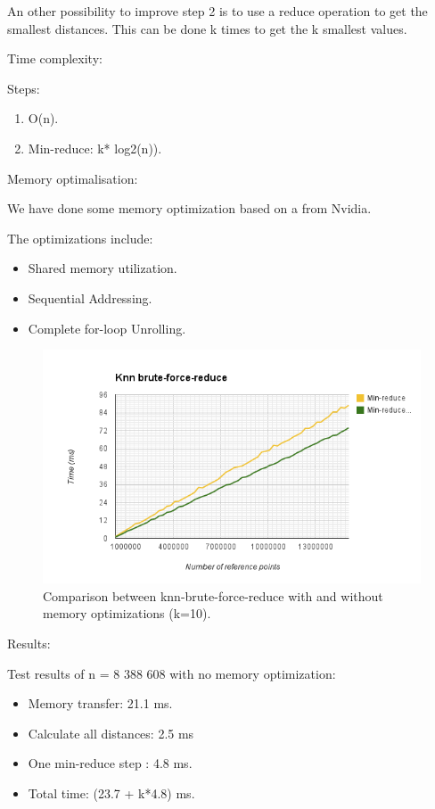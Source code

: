 An other possibility to improve step 2 is to use a reduce operation to get the smallest distances. This can be done k times to get the k smallest values.

Time complexity:

Steps:

\begin{enumerate}
    \item O(n).
    \item Min-reduce: k* log2(n)).
\end{enumerate}

Memory optimalisation:

We have done some memory optimization based on a
from Nvidia.

The optimizations include:

\begin{itemize}
    \item Shared memory utilization.
    \item Sequential Addressing.
    \item Complete for-loop Unrolling.
\end{itemize}

\begin{figure}[ht!]
\centering
\includegraphics[width=120mm]{../gfx/knn-brute-force-reduce-memory-opt.png}

\caption{Comparison between knn-brute-force-reduce with and without memory optimizations (k=10).}
\label{fig:knn_brute_force_reduce_memory_opt}
\end{figure}

Results:

Test results of n = 8 388 608 with no memory optimization:
\begin{itemize}
    \item Memory transfer:  21.1 ms.
    \item Calculate all distances: 2.5 ms
    \item One min-reduce step : 4.8 ms.
    \item Total time: (23.7 + k*4.8) ms.
\end{itemize}

